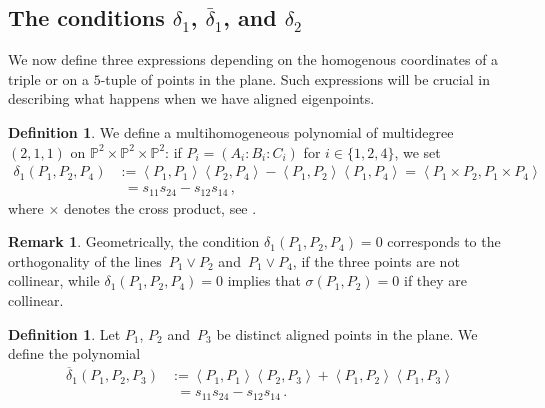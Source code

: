 \documentclass[a4paper, 11pt, reqno]{amsart}
\theoremstyle{plain}
\theoremstyle{definition}
\newtheorem{definition}[lemma]{Definition}
\newtheorem{rmk}[lemma]{Remark}
\newcommand{\p}{\mathbb{P}}
\newcommand{\scl}[2]{\left\langle {#1}, {#2} \right\rangle}
\begin{document}

\subsection{The conditions \texorpdfstring{$\delta_1$}{delta1}, \texorpdfstring{$\bar{\delta}_1$}{deltabar1}, and \texorpdfstring{$\delta_2$}{delta2}}

We now define three expressions depending on the homogenous coordinates of a triple or on a $5$-tuple of points in the plane.
Such expressions will be crucial in describing what happens when we have aligned eigenpoints.

\begin{definition}
\label{definition:delta1}
We define a multihomogeneous polynomial of multidegree~$(2,1,1)$ on $\p^2 \times \p^2 \times \p^2$:
if $P_i = (A_i: B_i: C_i)$ for $i \in \{1, 2, 4\}$, we set
%
\begin{align*}
  \delta_1(P_1, P_2, P_4) &:=
  \scl{P_1}{P_1} \scl{P_2}{P_4} - \scl{P_1}{P_2}\scl{P_1}{P_4} =
  \scl{P_1\times P_2}{P_1 \times P_4} \\
  &\phantom{:}= s_{11} s_{24}-s_{12}s_{14} \,,
\end{align*}
%
where $\times$ denotes the cross product, see .
\end{definition}

\begin{rmk}
\label{remark:delta1_meaning}
Geometrically, the condition $\delta_1(P_1, P_2, P_4) = 0$ corresponds to the orthogonality of the lines~$P_1 \vee P_2$ and~$P_1 \vee P_4$, if the three points are not collinear, while
$\delta_1(P_1, P_2, P_4) = 0$ implies that $\sigma (P_1,P_2)=0$ if they are collinear.
\end{rmk}

\begin{definition}
\label{definition:delta1b}
Let $P_1$, $P_2$ and~$P_3$ be distinct aligned points in the plane.
We define the polynomial
%
\begin{align*}
  \overline{\delta}_1(P_1, P_2, P_3) &:=
  \scl{P_1}{P_1} \scl{P_2}{P_3} + \scl{P_1}{P_2}\scl{P_1}{P_3} \\
  &\phantom{:}= s_{11} s_{24}-s_{12}s_{14}\,.
\end{align*}
%
\end{definition}
\end{document}
